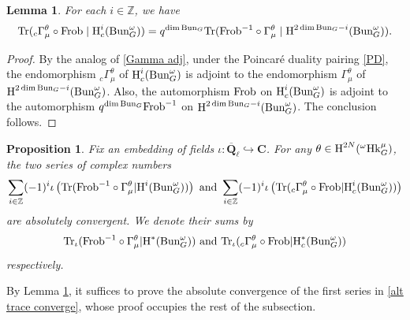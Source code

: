 \documentclass[reqno]{amsart}
\numberwithin{equation}{subsection}
\newtheorem{lemma}[subsubsection]{Lemma}
\newtheorem{prop}[subsubsection]{Proposition}
\theoremstyle{definition}
\def\CC{\mathbf{C}}
\def\ZZ{\mathbb{Z}}
\newcommand{\Bun}{\textup{Bun}}
\newcommand\Frob{\textup{Frob}}
\newcommand\Hk{\mathrm{Hk}}
\newcommand{\Tr}{\textup{Tr}}
\newcommand{\Qlbar}{\overline{\Q}_\ell}
\renewcommand\c\circ
\newcommand{\cohog}[2]{\textup{H}^{#1}({#2})}     %
\newcommand{\cohoc}[2]{\textup{H}_{c}^{#1}({#2})}     %
\newcommand{\incl}{\hookrightarrow}
\newcommand\G\Gamma
\newcommand{\io}{\iota}
\renewcommand{\th}{\theta}
\newcommand{\om}{\omega}
\newcommand{\Q}{\mathbf{Q}}
\begin{document}
\begin{lemma}\label{l:trace cGamma vs Gamma}
    For each $i\in \ZZ$, we have
    \begin{equation*}
        \Tr({}_c\G^\th_\mu\circ \Frob\mid \cohoc{i}{\Bun^\om_G})=q^{\dim \Bun_G}\Tr(\Frob^{-1}\circ\G^\th_\mu\mid\cohog{2\dim \Bun_G-i}{\Bun^\om_G}).
    \end{equation*}
\end{lemma}
\begin{proof}
    By the analog of \eqref{Gamma adj}, under the Poincar\'e duality pairing \eqref{PD}, the endomorphism ${}_{c}\Gamma^{\th}_{\mu}$ of $\cohoc{i}{\Bun^\om_G}$ is adjoint to the endomorphism $\Gamma^{\th}_{\mu}$ of $\cohog{2\dim \Bun_G-i}{\Bun_G^\om}$. Also, the automorphism $\Frob$ on $\cohoc{i}{\Bun^\om_G}$ is adjoint to the automorphism $q^{\dim \Bun_G}\Frob^{-1}$ on $\cohog{2\dim \Bun_G-i}{\Bun^\om_G}$. The conclusion follows.
\end{proof}


\begin{prop}\label{p:trace conv} Fix an embedding of fields $\io: \Qlbar\incl \CC$. For any $\th\in \cohog{2N}{{}^\om\Hk^\mu_G}$, the two series of complex numbers
    \begin{equation}\label{alt trace converge}
        \sum_{i\in \ZZ}(-1)^i\io\left(\Tr(\Frob^{-1}\c \G^\th_\mu|\cohog{i}{\Bun_G^\om})\right) \mbox{ and }\sum_{i\in \ZZ}(-1)^i\io\left(\Tr({}_c\G^\th_\mu\circ\Frob|\cohoc{i}{\Bun_G^\om})\right)
    \end{equation}
    are absolutely convergent. We denote their sums by 
    \begin{equation*}
        \Tr_\io(\Frob^{-1}\c \G^\th_\mu|\cohog{*}{\Bun_G^\om})\mbox{ and }\Tr_\io({}_c\G^\th_\mu\circ\Frob|\cohoc{*}{\Bun_G^\om})
    \end{equation*}
    respectively.
\end{prop}

By Lemma \ref{l:trace cGamma vs Gamma}, it suffices to prove the absolute convergence of the first series in \eqref{alt trace converge}, whose proof occupies the rest of the subsection.


    
    
\end{document}
